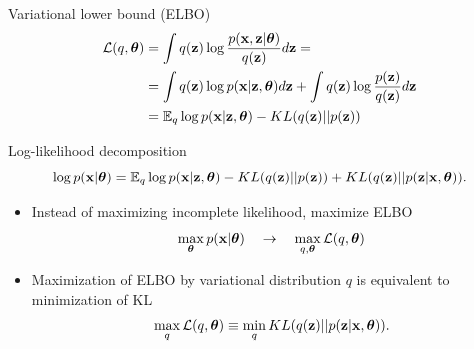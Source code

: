\begin{frame}{Variational lower bound (ELBO)}
	\vspace{-0.5cm}
	\begin{align*}
 	 \mathcal{L} (q, \boldsymbol{\theta}) &= \int q(\mathbf{z}) \log \frac{p(\mathbf{x}, \mathbf{z} | \boldsymbol{\theta})}{q(\mathbf{z})}d\mathbf{z} = \\ 
	  &= \int q(\mathbf{z}) \log p(\mathbf{x} | \mathbf{z}, \boldsymbol{\theta}) d\mathbf{z} + \int q(\mathbf{z}) \log \frac{p(\mathbf{z})}{q(\mathbf{z})}d\mathbf{z} \\ 
	  &= \mathbb{E}_{q} \log p(\mathbf{x} | \mathbf{z}, \boldsymbol{\theta}) - KL (q(\mathbf{z}) || p(\mathbf{z}))
	\end{align*}
	\vspace{-0.5cm}
	\begin{block}{Log-likelihood decomposition}
		\vspace{-0.5cm}
		\[
			 \log p(\mathbf{x}| \boldsymbol{\theta}) = \mathbb{E}_{q} \log p(\mathbf{x} | \mathbf{z}, \boldsymbol{\theta}) - KL (q(\mathbf{z}) || p(\mathbf{z})) + KL(q(\mathbf{z}) || p(\mathbf{z}|\mathbf{x}, \boldsymbol{\theta})).
		\]
	\end{block}
	\begin{itemize}
	\item Instead of maximizing incomplete likelihood, maximize ELBO
   	\[
	    \max_{\boldsymbol{\theta}} p(\mathbf{x} | \boldsymbol{\theta}) \quad \rightarrow \quad \max_{q, \boldsymbol{\theta}} \mathcal{L} (q, \boldsymbol{\theta})
   	\]
   	\item Maximization of ELBO by variational distribution $q$ is equivalent to minimization of KL
  	\[
	    \max_q \mathcal{L} (q, \boldsymbol{\theta}) \equiv \min_q KL(q(\mathbf{z}) || p(\mathbf{z}|\mathbf{x}, \boldsymbol{\theta})).
  	\]
  	\end{itemize}
	   	    
\end{frame}
